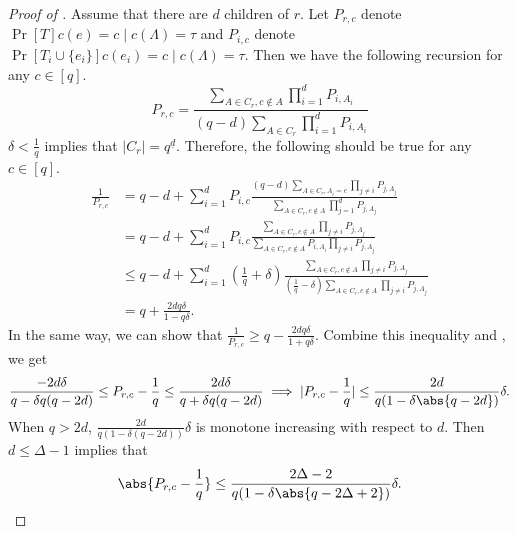 \begin{proof}[Proof of ]
    Assume that there are $d$ children of $r$.
    Let $P_{r,c}$ denote $\Pr[T]{c(e) = c\mid c(\Lambda) = \tau}$ and $P_{i,c}$ denote $\Pr[T_i\cup\{e_i\}]{c(e_i) = c\mid c(\Lambda) = \tau}$.
    Then we have the following recursion for any $c\in [q]$.
    $$
        P_{r,c} = \frac{\displaystyle \sum_{A\in C_r, c\notin A}\prod_{i=1}^d P_{i,A_i}}{(q-d) \displaystyle \sum_{A\in C_r}\prod_{i=1}^d P_{i,A_i}}
    $$
    $\delta < \frac 1q$ implies that $|C_r| = q^{\underline{d}}$. Therefore, the following should be true for any $c\in[q]$.
    \begin{align}
        \nonumber \frac 1{P_{r,c}} &= q - d + \sum_{i=1}^d P_{i,c}\frac{\displaystyle (q-d)\sum_{A\in C_r, A_i = c}\prod_{j\neq i}P_{j,A_j}}{\displaystyle \sum_{A\in C_r, c\notin A}\prod_{j=1}^d P_{j,A_j}}
        \\\nonumber &= q - d + \sum_{i=1}^d P_{i,c}\frac{\displaystyle \sum_{A\in C_r, c\notin A}\prod_{j\neq i}P_{j,A_j}}{\displaystyle \sum_{A\in C_r, c\notin A}P_{i,A_i}\prod_{j\neq i} P_{j,A_j}}
        \\\nonumber &\leq q - d + \sum_{i=1}^d (\frac 1q + \delta)\frac{\displaystyle \sum_{A\in C_r, c\notin A}\prod_{j\neq i}P_{j,A_j}}{\displaystyle (\frac 1q - \delta)\sum_{A\in C_r, c\notin A}\prod_{j\neq i} P_{j,A_j}}
        \\ \label{eq:left_side_WSM_contraction} &= q + \frac{2dq\delta}{1-q\delta}.
    \end{align}
    In the same way, we can show that $\frac 1{P_{r,c}} \geq q - \frac{2dq\delta}{1 + q\delta}$. 
    Combine this inequality and , we get
    $$
        \frac{-2d\delta}{q-\delta q(q-2d)}\leq P_{r,c} - \frac 1q \leq \frac{2d\delta}{q+\delta q(q-2d)}
        \implies |P_{r,c} - \frac 1q| \leq \frac{2d}{q(1 - \delta\abs{q-2d})} \delta.
    $$
    When $q > 2d$, $\frac{2d}{q(1 - \delta(q-2d))} \delta$ is monotone increasing with respect to $d$. Then $d\leq \Delta - 1$ implies that
    $$
        \abs{P_{r,c} - \frac 1q} \leq \frac{2\Delta - 2}{q(1 - \delta\abs{q-2\Delta + 2})} \delta.
    $$
\end{proof}
